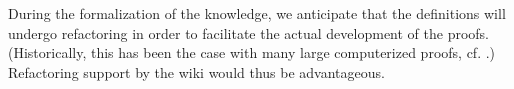 During the formalization of the knowledge, we anticipate that the
definitions will undergo refactoring in order to facilitate the
actual development of the proofs.  (Historically, this has been the 
case with many large computerized proofs, cf. \cite{Gonthier:2005:FourColor}.) 
Refactoring support by the wiki would thus be advantageous.



